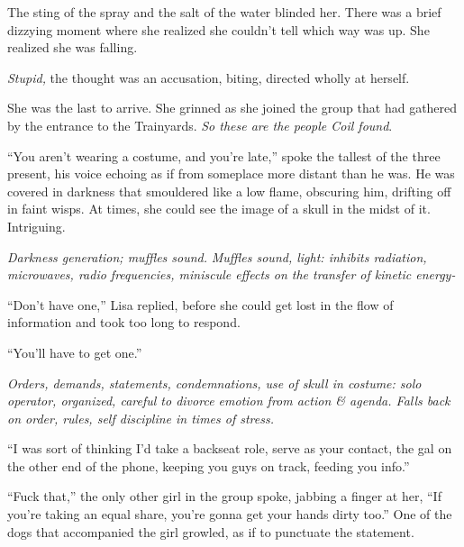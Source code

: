 {The sting of the spray and the salt of the water blinded her.  There was a brief dizzying moment where she realized she couldn't tell which way was up.  She realized she was falling.



\emph{Stupid, }the thought was an accusation, biting, directed wholly at herself.



\sectionbreak



She was the last to arrive.  She grinned as she joined the group that had gathered by the entrance to the Trainyards.  \emph{So these are the people Coil found}.



``You aren't wearing a costume, and you're late,'' spoke the tallest of the three present, his voice echoing as if from someplace more distant than he was.  He was covered in darkness that smouldered like a low flame, obscuring him, drifting off in faint wisps.  At times, she could see the image of a skull in the midst of it.  Intriguing.



\emph{Darkness generation; muffles sound.}\emph{ Muffles sound, light: inhibits radiation, microwaves, radio frequencies, miniscule effects on the transfer of kinetic energy-}



``Don't have one,'' Lisa replied, before she could get lost in the flow of information and took too long to respond.



``You'll have to get one.''



\emph{Orders, demands, statements, condemnations, use of skull in costume: solo operator, organized, careful to divorce emotion from action & agenda.  Falls back on order, rules, self discipline in times of stress.}



``I was sort of thinking I'd take a backseat role, serve as your contact, the gal on the other end of the phone, keeping you guys on track, feeding you info.''



``Fuck that,'' the only other girl in the group spoke, jabbing a finger at her, ``If you're taking an equal share, you're gonna get your hands dirty too.''  One of the dogs that accompanied the girl growled, as if to punctuate the statement.



}
